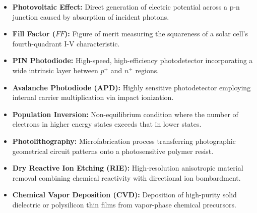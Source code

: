 \documentclass[12pt,a4paper]{article}
\begin{document}
\begin{tcolorbox}[defbox, title={\textbf{One-Line Definitions}}]
\begin{itemize}[leftmargin=*, itemsep=2pt, topsep=0pt]
  \item \textbf{Photovoltaic Effect:} Direct generation of electric potential across a p-n junction caused by absorption of incident photons.
  \item \textbf{Fill Factor ($FF$):} Figure of merit measuring the squareness of a solar cell's fourth-quadrant I-V characteristic.
  \item \textbf{PIN Photodiode:} High-speed, high-efficiency photodetector incorporating a wide intrinsic layer between $p^+$ and $n^+$ regions.
  \item \textbf{Avalanche Photodiode (APD):} Highly sensitive photodetector employing internal carrier multiplication via impact ionization.
  \item \textbf{Population Inversion:} Non-equilibrium condition where the number of electrons in higher energy states exceeds that in lower states.
  \item \textbf{Photolithography:} Microfabrication process transferring photographic geometrical circuit patterns onto a photosensitive polymer resist.
  \item \textbf{Dry Reactive Ion Etching (RIE):} High-resolution anisotropic material removal combining chemical reactivity with directional ion bombardment.
  \item \textbf{Chemical Vapor Deposition (CVD):} Deposition of high-purity solid dielectric or polysilicon thin films from vapor-phase chemical precursors.
\end{itemize}
\end{tcolorbox}
\end{document}
